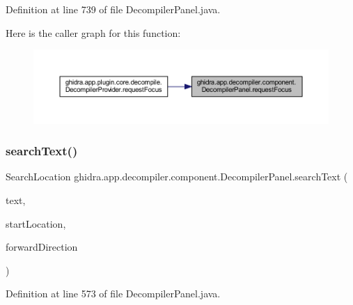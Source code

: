 Definition at line 739 of file Decompiler\+Panel.\+java.

Here is the caller graph for this function\+:
\nopagebreak
\begin{figure}[H]
\begin{center}
\leavevmode
\includegraphics[width=350pt]{classghidra_1_1app_1_1decompiler_1_1component_1_1_decompiler_panel_a340360330f720fc888ef2de5ffea0a7b_icgraph}
\end{center}
\end{figure}
\mbox{\label{classghidra_1_1app_1_1decompiler_1_1component_1_1_decompiler_panel_adec77ffde808184f39f911e173093426}} 
\subsubsection{\texorpdfstring{searchText()}{searchText()}}
{\footnotesize\ttfamily Search\+Location ghidra.\+app.\+decompiler.\+component.\+Decompiler\+Panel.\+search\+Text (\begin{DoxyParamCaption}\item[{String}]{text,  }\item[{Field\+Location}]{start\+Location,  }\item[{boolean}]{forward\+Direction }\end{DoxyParamCaption})\hspace{0.3cm}{\ttfamily [inline]}}



Definition at line 573 of file Decompiler\+Panel.\+java.

